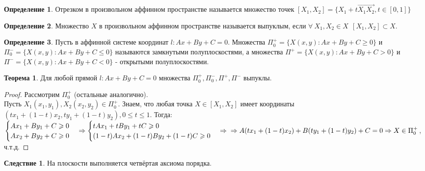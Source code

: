 \documentclass[a4paper, 12pt]{article}
\theoremstyle{definition}
\newtheorem*{definition}{Определение}
\newtheorem*{theorem}{Теорема}
\newtheorem*{consequense}{Следствие}
\begin{document}
	\begin{definition}
		Отрезком в произвольном аффинном пространстве называется множество точек $[X_{1}, X_{2}] = \{X_{1} + t\overrightarrow{X_{1}X_{2}}, t\in [0, 1]\}$
	\end{definition}
	\begin{definition}
		Множество $X$ в произвольном аффинном пространстве называется выпуклым, если $\forall \ X_{1},X_{2} \in X \ \ [X_{1}, X_{2}] \subset X$. 
	\end{definition}
	\begin{definition}
		Пусть в аффинной системе координат $l: Ax + By + C = 0$. Множества $\Pi_{0}^{+} = \{X(x, y): Ax + By + C \geqslant 0\}$ и $\Pi_{0}^{-} = \{X(x, y): Ax + By + C \leqslant 0\}$ называются замкнутыми полуплоскостями, а множества $\Pi^{+} = \{X(x, y): Ax + By + C > 0\}$ и $\Pi^{-} = \{X(x, y): Ax + By + C < 0\}$ - открытыми полуплоскостями.
	\end{definition}
	\begin{theorem}
		Для любой прямой $l: Ax + By + C = 0$ множества $\Pi_{0}^{+}, \Pi_{0}^{-}, \Pi^{+}, \Pi^{-}$ выпуклы.
	\end{theorem}
	\begin{proof}
		Рассмотрим $\Pi_{0}^{+}$ (остальные аналогично).\\
		Пусть $X_{1}(x_{1}, y_{1}), X_{2}(x_{2}, y_{2}) \in \Pi_{0}^{+}$. Знаем, что любая точка $X \in [X_{1}, X_{2}]$ имеет координаты $(tx_{1}+(1-t)x_{2}, ty_{1}+(1-t)y_{2}), 0 \leqslant t \leqslant 1$. Тогда:\\
		$\begin{cases}Ax_{1} + By_{1} + C \geqslant 0 \\ Ax_{2} + By_{2} + C \geqslant 0\end{cases} \Rightarrow \begin{cases}tAx_{1} + tBy_{1} + tC \geqslant 0 \\ (1-t)Ax_{2} + (1-t)By_{2} + (1-t)C \geqslant 0\end{cases} \Rightarrow \\ \Rightarrow A(tx_{1}+(1-t)x_{2}) + B(ty_{1}+(1-t)y_{2}) + C = 0 \Rightarrow X \in \Pi_{0}^{+}$, ч.т.д.
	\end{proof}
	\begin{consequense}
		На плоскости выполняется четвёртая аксиома порядка.
	\end{consequense}
\end{document}
